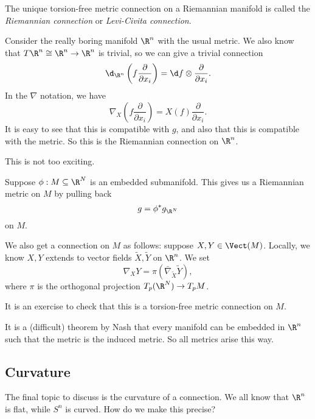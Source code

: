 \documentclass[a4paper]{article}
\begin{document}
\begin{defi}
  The unique torsion-free metric connection on a Riemannian manifold is called the \emph{Riemannian connection} or \emph{Levi-Civita connection}.
\end{defi}

\begin{eg}
  Consider the really boring manifold $\R^n$ with the usual metric. We also know that $T\R^n \cong \R^n \to \R^n$ is trivial, so we can give a trivial connection
  \[
    \d_{\R^n} \left(f \frac{\partial}{\partial x_i}\right) = \d f \otimes \frac{\partial}{\partial x_i}.
  \]
  In the $\nabla$ notation, we have
  \[
    \nabla_X \left(f \frac{\partial}{\partial x_i}\right) = X(f) \frac{\partial}{\partial x_i}.
  \]
  It is easy to see that this is compatible with $g$, and also that this is compatible with the metric. So this is the Riemannian connection on $\R^n$.
\end{eg}
This is not too exciting.
\begin{eg}
  Suppose $\phi: M \subseteq \R^N$ is an embedded submanifold. This gives us a Riemannian metric on $M$ by pulling back
  \[
    g = \phi^* g_{\R^N}
  \]
  on $M$.

  We also get a connection on $M$ as follows: suppose $X, Y \in \Vect(M)$. Locally, we know $X, Y$ extends to vector fields $\tilde{X}, \tilde{Y}$ on $\R^n$. We set
  \[
    \nabla_X Y = \pi (\bar\nabla_{\tilde{X}} \tilde{Y}),
  \]
  where $\pi$ is the orthogonal projection $T_p(\R^N) \to T_pM$.

  It is an exercise to check that this is a torsion-free metric connection on $M$.
\end{eg}

It is a (difficult) theorem by Nash that every manifold can be embedded in $\R^n$ such that the metric is the induced metric. So all metrics arise this way.

\subsection{Curvature}
The final topic to discuss is the curvature of a connection. We all know that $\R^n$ is flat, while $S^n$ is curved. How do we make this precise?
\end{document}
